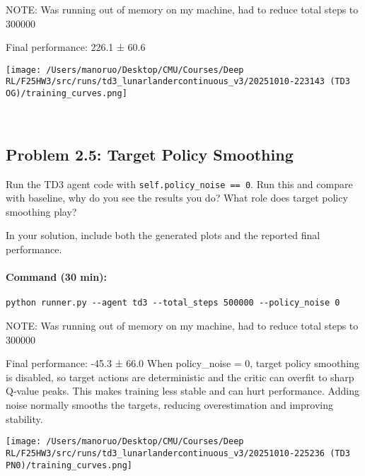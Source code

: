 \documentclass[12pt]{article}
\begin{document}
\begin{solution}[height=10cm]

NOTE: Was running out of memory on my machine, had to reduce total steps to 300000

Final performance: 226.1 ± 60.6

 \centering
    \texttt{[image: /Users/manoruo/Desktop/CMU/Courses/Deep RL/F25HW3/src/runs/td3\_lunarlandercontinuous\_v3/20251010-223143 (TD3 OG)/training\_curves.png]}
    \label{fig:td3_basic}

\
\end{solution}

\subsection*{Problem 2.5: Target Policy Smoothing}

Run the TD3 agent code with \texttt{self.policy_noise == 0}. Run this and compare with baseline, why do you see the results you do? What role does target policy smoothing play? 

In your solution, include both the generated plots and the reported final performance.

\paragraph{Command (30 min):}
\begin{verbatim}
python runner.py --agent td3 --total_steps 500000 --policy_noise 0
\end{verbatim}

\begin{solution}[height=5cm]

NOTE: Was running out of memory on my machine, had to reduce total steps to 300000


Final performance: -45.3 ± 66.0
\newline\newline
When policy_noise = 0, target policy smoothing is disabled, so target actions are deterministic and the critic can overfit to sharp Q-value peaks. 
This makes training less stable and can hurt performance. Adding noise normally smooths the targets, 
reducing overestimation and improving stability.

 \centering
    \texttt{[image: /Users/manoruo/Desktop/CMU/Courses/Deep RL/F25HW3/src/runs/td3\_lunarlandercontinuous\_v3/20251010-225236 (TD3 PN0)/training\_curves.png]}
    \label{fig:td3_pn0}


\end{solution}
\end{document}
